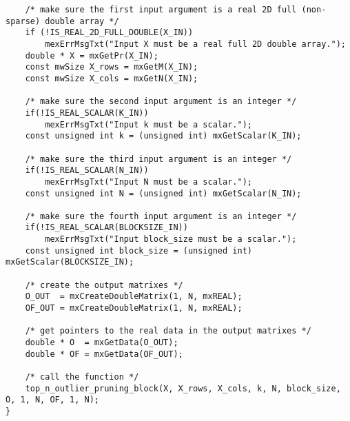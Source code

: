 \begin{lstlisting}
    /* make sure the first input argument is a real 2D full (non-sparse) double array */
    if (!IS_REAL_2D_FULL_DOUBLE(X_IN))
        mexErrMsgTxt("Input X must be a real full 2D double array.");
    double * X = mxGetPr(X_IN);
    const mwSize X_rows = mxGetM(X_IN);
    const mwSize X_cols = mxGetN(X_IN);

    /* make sure the second input argument is an integer */
    if(!IS_REAL_SCALAR(K_IN))
        mexErrMsgTxt("Input k must be a scalar.");
    const unsigned int k = (unsigned int) mxGetScalar(K_IN);

    /* make sure the third input argument is an integer */
    if(!IS_REAL_SCALAR(N_IN))
        mexErrMsgTxt("Input N must be a scalar.");
    const unsigned int N = (unsigned int) mxGetScalar(N_IN);

    /* make sure the fourth input argument is an integer */
    if(!IS_REAL_SCALAR(BLOCKSIZE_IN))
        mexErrMsgTxt("Input block_size must be a scalar.");
    const unsigned int block_size = (unsigned int) mxGetScalar(BLOCKSIZE_IN);

    /* create the output matrixes */
    O_OUT  = mxCreateDoubleMatrix(1, N, mxREAL);
    OF_OUT = mxCreateDoubleMatrix(1, N, mxREAL);

    /* get pointers to the real data in the output matrixes */
    double * O  = mxGetData(O_OUT);
    double * OF = mxGetData(OF_OUT);

    /* call the function */
    top_n_outlier_pruning_block(X, X_rows, X_cols, k, N, block_size, O, 1, N, OF, 1, N);
}
\end{lstlisting}
